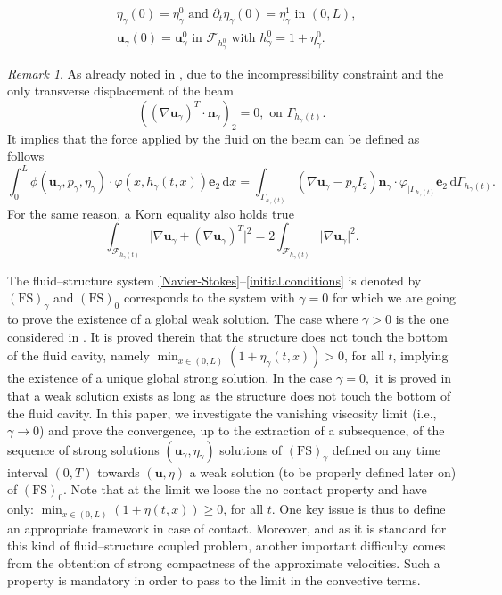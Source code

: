 \documentclass[11pt]{article}
\newcommand{\ie}{i.e.,\xspace}
\let\mathcal\mathscr
\newcommand{\FS}{\mathrm{FS}}
\theoremstyle{remark}
\newtheorem{remark}[theorem]{Remark}
\theoremstyle{definition}
\newcommand{\ug}{\boldsymbol{u}}
\newcommand{\dd}{\,\mathrm{d}}
\newcommand{\normal}{\BS{n}}
\newcommand{\BS}[1]{\boldsymbol{#1}}
\begin{document}
\begin{equation}\label{initial.conditions}
\begin{aligned}
&\eta_{\gamma}(0)=\eta^{0}_\gamma\text{ and }\partial_{t}\eta_{\gamma}(0)=\eta_\gamma^{1}\text{ in }(0,L),\\
&\ug_{\gamma}(0)=\ug_\gamma^{0}\text{ in }\mathcal{F}_{h_\gamma^{0}}\text{ with }h_\gamma^{0}=1+\eta_\gamma^{0}.
\end{aligned}
\end{equation}
\begin{remark}\label{rem:korn}
As already noted in \cite{Chambolle-etal}, due to the incompressibility constraint and the only transverse displacement of the beam
\[
\left((\nabla \ug_\gamma)^T\cdot\normal_\gamma\right)_2=0, \text{ on }\Gamma_{h_{\gamma}(t)}.
\]
It implies that the force applied by the fluid on the beam can be defined as follows
\[
\int_{0}^{L}\phi(\ug_{\gamma},p_{\gamma},\eta_{\gamma})\cdot \varphi(x,h_{\gamma}(t,x))\BS{e}_{2}\dd x=\int_{\Gamma_{h_{\gamma}(t)}}(\nabla\ug_{\gamma}-p_{\gamma}I_2)\normal_{\gamma}\cdot \varphi_{\vert\Gamma_{h_{\gamma}(t)}}\BS{e}_{2}\dd\Gamma_{h_{\gamma}(t)}.
\]
For the same reason, a Korn equality also holds true
\[
\int_{\mathcal{F}_{h_\gamma(t)}} \vert\nabla\ug_{\gamma} +( \nabla\ug_{\gamma})^{T}\vert^2 =2\int_{\mathcal{F}_{h_\gamma(t)}} \vert\nabla\ug_{\gamma} \vert^2.
\]
\end{remark}

The fluid--structure system \eqref{Navier-Stokes}--\eqref{initial.conditions} is denoted by $(\FS)_{\gamma}$ and $(\FS)_0$ corresponds to the system with $\gamma=0$ for which we are going to prove the existence of a global weak solution.
The case where $\gamma>0$ is the one considered in \cite{Grandmont-Hillairet}. It is proved therein that the structure does not touch the bottom of the fluid cavity, namely $\min_{x\in (0, L)}(1+\eta_\gamma(t, x)) >0$, for all $t$, implying the existence of a unique global strong solution. In the case $\gamma=0,$ it is proved in \cite{Grandmont08, Muha-Canic13} that a weak solution exists as long as the structure does not touch the bottom of the fluid cavity. In this paper, we investigate the vanishing viscosity limit (\ie $\gamma\to 0$) and prove the convergence, up to the extraction of a subsequence, of the sequence of strong solutions $(\ug_\gamma,\eta_\gamma)$ solutions of $(\FS)_{\gamma}$ defined on any time interval $(0, T)$ towards $(\ug, \eta)$ a weak solution (to be properly defined later on) of $(\FS)_0$. Note that at the limit we loose the no contact property and have only: $\min_{x\in (0, L)}(1+\eta(t, x))\geq 0$, for all $t$. One key issue is thus to define an appropriate framework in case of contact. Moreover, and as it is standard for this kind of fluid--structure coupled problem, another important difficulty comes from the obtention of strong compactness of the approximate velocities. Such a property is mandatory in order to pass to the limit in the convective terms.
 
\end{document}
